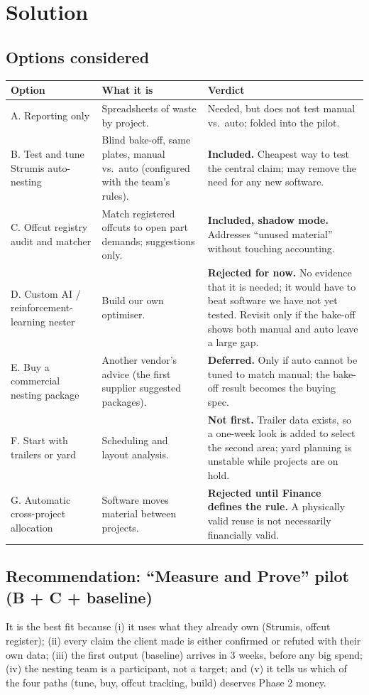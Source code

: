 \documentclass[10pt,a4paper]{article}
\begin{document}
\section{Solution}
\subsection{Options considered}
\small
\begin{tabular}{@{}P{4.1cm}P{6.0cm}P{5.7cm}@{}}
\toprule
\textbf{Option} & \textbf{What it is} & \textbf{Verdict} \\
\midrule
A. Reporting only & Spreadsheets of waste by project. & Needed, but does not test manual vs.\ auto; folded into the pilot. \\
B. Test and tune Strumis auto-nesting & Blind bake-off, same plates, manual vs.\ auto (configured with the team's rules). & \textbf{Included.} Cheapest way to test the central claim; may remove the need for any new software. \\
C. Offcut registry audit and matcher & Match registered offcuts to open part demands; suggestions only. & \textbf{Included, shadow mode.} Addresses ``unused material'' without touching accounting. \\
D. Custom AI / reinforcement-learning nester & Build our own optimiser. & \textbf{Rejected for now.} No evidence that it is needed; it would have to beat software we have not yet tested. Revisit only if the bake-off shows both manual and auto leave a large gap. \\
E. Buy a commercial nesting package & Another vendor's advice (the first supplier suggested packages). & \textbf{Deferred.} Only if auto cannot be tuned to match manual; the bake-off result becomes the buying spec. \\
F. Start with trailers or yard & Scheduling and layout analysis. & \textbf{Not first.} Trailer data exists, so a one-week look is added to select the second area; yard planning is unstable while projects are on hold. \\
G. Automatic cross-project allocation & Software moves material between projects. & \textbf{Rejected until Finance defines the rule.} A physically valid reuse is not necessarily financially valid. \\
\bottomrule
\end{tabular}
\normalsize

\subsection{Recommendation: ``Measure and Prove'' pilot (B + C + baseline)}
It is the best fit because (i) it uses what they already own (Strumis, offcut register); (ii) every claim the client made is either confirmed or refuted with their own data; (iii) the first output (baseline) arrives in 3 weeks, before any big spend; (iv) the nesting team is a participant, not a target; and (v) it tells us which of the four paths (tune, buy, offcut tracking, build) deserves Phase 2 money.
\end{document}

